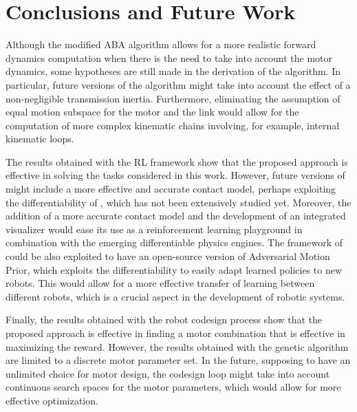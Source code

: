 \chapter{Conclusions and Future Work}
\label{chp:contrib_Conclusions}


Although the modified \ac{ABA} algorithm allows for a more realistic forward dynamics computation when there is the need to take into account the motor dynamics, some hypotheses are still made in the derivation of the algorithm. In particular, future versions of the algorithm might take into account the effect of a non-negligible transmission inertia. Furthermore, eliminating the assumption of equal motion subspace for the motor and the link would allow for the computation of more complex kinematic chains involving, for example, internal kinematic loops.

The results obtained with the \ac{RL} framework show that the proposed approach is effective in solving the tasks considered in this work. However, future versions of \jaxsim might include a more effective and accurate contact model, perhaps exploiting the differentiability of \jax, which has not been extensively studied yet. Moreover, the addition of a more accurate contact model and the development of an integrated visualizer would ease its use as a reinforcement learning playground in combination with the emerging differentiable physics engines.
The framework of \jax could be also exploited to have an open-source version of Adversarial Motion Prior, which exploits the differentiability to easily adapt learned policies to new robots. This would allow for a more effective transfer of learning between different robots, which is a crucial aspect in the development of robotic systems.

Finally, the results obtained with the robot codesign process show that the proposed approach is effective in finding a motor combination that is effective in maximizing the reward. However, the results obtained with the genetic algorithm are limited to a discrete motor parameter set. In the future, supposing to have an unlimited choice for motor design, the codesign loop might take into account continuous search spaces for the motor parameters, which would allow for more effective optimization.